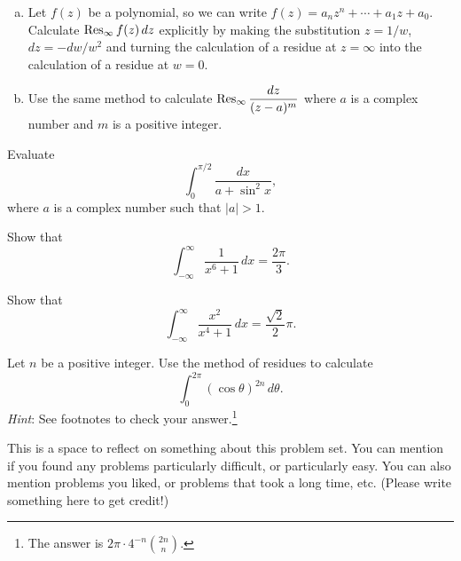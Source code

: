 \begin{problem}
  \leavevmode\begin{enumerate}[(a)]
    \item Let $f(z)$ be a polynomial, so we can write $f(z)=a_nz^n+\cdots+a_1z+a_0$. Calculate $\operatorname{Res}_\infty f(z)\,dz$ explicitly by making the substitution $z=1/w$, $dz=-dw/w^2$ and turning the calculation of a residue at $z=\infty$ into the calculation of a residue at $w=0$.
    \item Use the same method to calculate $\displaystyle\operatorname{Res}_\infty\frac{dz}{(z-a)^m}$ where $a$ is a complex number and $m$ is a positive integer.
  \end{enumerate}
\end{problem}

\begin{problem}
  Evaluate
  \[\int_0^{\pi/2}\frac{dx}{a+\sin^2 x},\]
  where $a$ is a complex number such that $|a|>1$.
\end{problem}

\begin{problem}
  Show that
  \[\int_{-\infty}^\infty\frac 1{x^6+1}\,dx=\frac{2\pi}3.\]
\end{problem}

\begin{problem}
  Show that
  \[\int_{-\infty}^\infty\frac {x^2}{x^4+1}\,dx=\frac{\sqrt2}2\pi.\]
\end{problem}

\begin{problem}
  Let $n$ be a positive integer. Use the method of residues to calculate
  \[\int_0^{2\pi}(\cos\theta)^{2n}\,d\theta.\]
  \emph{Hint}: See footnotes to check your answer.\footnote{The answer is ${2\pi}\cdot 4^{-n}\binom{2n}{n}$.}
\end{problem}

\begin{problem}
  This is a space to reflect on something about this problem set. You can mention if you found any problems particularly difficult, or particularly easy. You can also mention problems you liked, or problems that took a long time, etc. (Please write something here to get credit!)
\end{problem}
